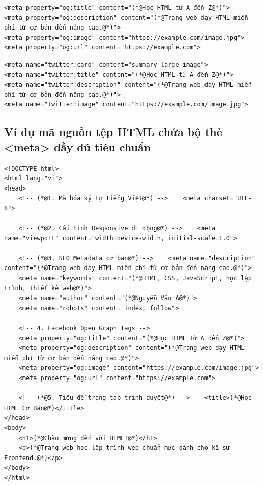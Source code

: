 \documentclass[11pt,oneside]{book}
\begin{document}
\begin{codeWindow}
\begin{lstlisting}[language=HTML5]
<meta property="og:title" content="(*@Học HTML từ A đến Z@*)">
<meta property="og:description" content="(*@Trang web dạy HTML miễn phí từ cơ bản đến nâng cao.@*)">
<meta property="og:image" content="https://example.com/image.jpg">
<meta property="og:url" content="https://example.com">
\end{lstlisting}
\end{codeWindow}

\begin{codeWindow}
\begin{lstlisting}[language=HTML5]
<meta name="twitter:card" content="summary_large_image">
<meta name="twitter:title" content="(*@Học HTML từ A đến Z@*)">
<meta name="twitter:description" content="(*@Trang web dạy HTML miễn phí từ cơ bản đến nâng cao.@*)">
<meta name="twitter:image" content="https://example.com/image.jpg">
\end{lstlisting}
\end{codeWindow}

\subsection{Ví dụ mã nguồn tệp HTML chứa bộ thẻ <meta> đầy đủ tiêu chuẩn}

\begin{codeWindow}
\begin{lstlisting}[language=HTML5]
<!DOCTYPE html>
<html lang="vi">
<head>
    <!-- (*@1. Mã hóa ký tự tiếng Việt@*) -->    <meta charset="UTF-8">
    
    <!-- (*@2. Cấu hình Responsive di động@*) -->    <meta name="viewport" content="width=device-width, initial-scale=1.0">
    
    <!-- (*@3. SEO Metadata cơ bản@*) -->    <meta name="description" content="(*@Trang web dạy HTML miễn phí từ cơ bản đến nâng cao.@*)">
    <meta name="keywords" content="(*@HTML, CSS, JavaScript, học lập trình, thiết kế web@*)">
    <meta name="author" content="(*@Nguyễn Văn A@*)">
    <meta name="robots" content="index, follow">
    
    <!-- 4. Facebook Open Graph Tags -->
    <meta property="og:title" content="(*@Học HTML từ A đến Z@*)">
    <meta property="og:description" content="(*@Trang web dạy HTML miễn phí từ cơ bản đến nâng cao.@*)">
    <meta property="og:image" content="https://example.com/image.jpg">
    <meta property="og:url" content="https://example.com">
    
    <!-- (*@5. Tiêu đề trang tab trình duyệt@*) -->    <title>(*@Học HTML Cơ Bản@*)</title>
</head>
<body>
    <h1>(*@Chào mừng đến với HTML!@*)</h1>
    <p>(*@Trang web học lập trình web chuẩn mực dành cho kĩ sư Frontend.@*)</p>
</body>
</html>
\end{lstlisting}
\end{codeWindow}
\end{document}

